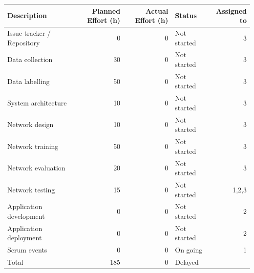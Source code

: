 \documentclass{article}
\begin{document}
\begin{center}
\begin{tabular}{lrrlr}
Description & Planned Effort (h) & Actual Effort (h) & Status & Assigned to\\
\hline
Issue tracker / Repository & 0 & 0 & Not started & 3\\
Data collection & 30 & 0 & Not started & 3\\
Data labelling & 50 & 0 & Not started & 3\\
System architecture & 10 & 0 & Not started & 3\\
Network design & 10 & 0 & Not started & 3\\
Network training & 50 & 0 & Not started & 3\\
Network evaluation & 20 & 0 & Not started & 3\\
Network testing & 15 & 0 & Not started & 1,2,3\\
Application development & 0 & 0 & Not started & 2\\
Application deployment & 0 & 0 & Not started & 2\\
Scrum events & 0 & 0 & On going & 1\\
\hline
Total & 185 & 0 & Delayed & \\
\end{tabular}
\end{center}
\end{document}
